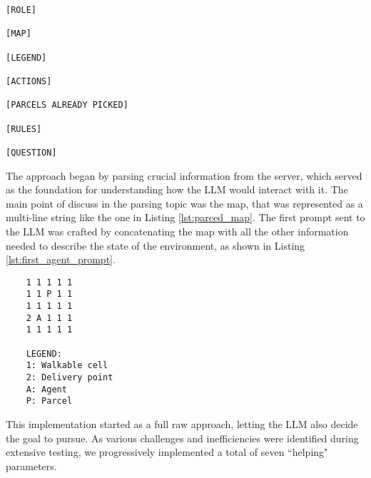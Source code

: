 \vspace{1mm}
\begin{codewindow}
  [Text]  \begin{lstlisting}
[ROLE]

[MAP]

[LEGEND]

[ACTIONS]

[PARCELS ALREADY PICKED]

[RULES]

[QUESTION]
\end{lstlisting}
\end{codewindow}
\vspace{1mm}

The approach began by parsing crucial information from the server, which served as
the foundation for understanding how the LLM would interact with it. The main
point of discuss in the parsing topic was the map, that was represented as a multi-line
string like the one in Listing \ref{lst:parced_map}. The first prompt sent to
the LLM was crafted by concatenating the map with all the other information
needed to describe the state of the environment, as shown in Listing \ref{lst:first_agent_prompt}.

\vspace{1mm}
\begin{codewindow}
  [Text]  \begin{lstlisting}
    1 1 1 1 1
    1 1 P 1 1
    1 1 1 1 1
    2 A 1 1 1
    1 1 1 1 1

    LEGEND:
    1: Walkable cell
    2: Delivery point
    A: Agent
    P: Parcel
\end{lstlisting}
\end{codewindow}
\vspace{1mm}

This implementation started as a full raw approach, letting the LLM also decide the
goal to pursue. As various challenges and inefficiencies were identified during
extensive testing, we progressively implemented a total of seven ``helping"
parameters.

